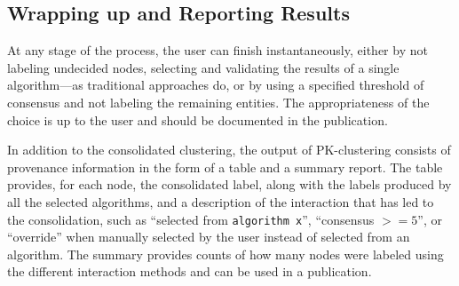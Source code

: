 


\subsection {Wrapping up and Reporting Results}

At any stage of the process, the user can finish instantaneously, either by not labeling undecided nodes, selecting and validating the results of a single algorithm---as traditional approaches do, or by using a specified threshold of consensus and not labeling the remaining entities. The appropriateness of the choice is up to the user and should be documented in the publication.

In addition to the consolidated clustering, the output of PK-clustering consists of provenance information in the form of a table and a summary report.
The table provides, for each node, the consolidated label, along with the labels produced by all the selected algorithms, and a description of the interaction that has led to the consolidation, such as ``selected from \verb|algorithm x|'', ``consensus $>= 5$'', or ``override'' when manually selected by the user instead of selected from an algorithm.  The summary provides counts of how many nodes were labeled using the different interaction methods and can be used in a publication.

